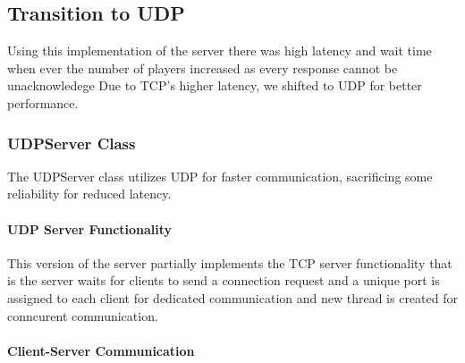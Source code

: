 \subsection{Transition to UDP}
Using this implementation of the server there was high latency and wait time when ever the number of players increased as every response cannot be unacknowledege Due to TCP's higher latency, we shifted to UDP for better performance.

\subsubsection{UDPServer Class}
The UDPServer class utilizes UDP for faster communication, sacrificing some reliability for reduced latency.

\paragraph{UDP Server Functionality}

    This version of the server partially implements the TCP server functionality that is the server waits for clients to send a connection request and a unique port is assigned to each client for dedicated communication and new thread is created for conncurent communication.

\paragraph{Client-Server Communication}

